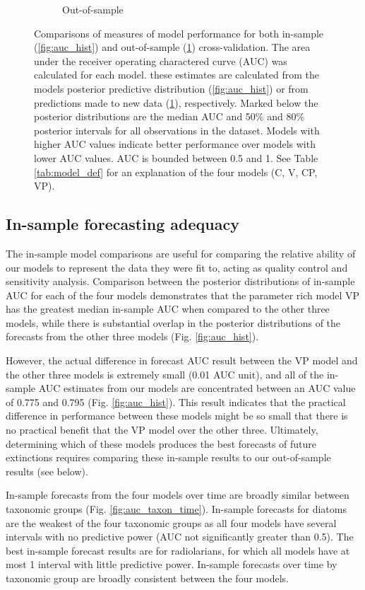 \documentclass[12pt,letterpaper]{article}
\begin{document}
\begin{refsection}
\begin{figure}[ht]
\begin{subfigure}[ht]{0.45\textwidth}
  \caption{Out-of-sample}
  \label{fig:fold_auc}
 \end{subfigure}
 \caption{Comparisons of measures of model performance for both in-sample (\ref{fig:auc_hist}) and out-of-sample (\ref{fig:fold_auc}) cross-validation. The area under the receiver operating charactered curve (AUC) was calculated for each model. these estimates are calculated from the models posterior predictive distribution (\ref{fig:auc_hist}) or from predictions made to new data (\ref{fig:fold_auc}), respectively. Marked below the posterior distributions are the median AUC and 50\% and 80\% posterior intervals for all observations in the dataset. Models with higher AUC values indicate better performance over models with lower AUC values. AUC is bounded between 0.5 and 1. See Table \ref{tab:model_def} for an explanation of the four models (C, V, CP, VP).}
 \label{fig:auc_compare}
\end{figure}

\subsection{In-sample forecasting adequacy}

The in-sample model comparisons are useful for comparing the relative ability of our models to represent the data they were fit to, acting as quality control and sensitivity analysis. Comparison between the posterior distributions of in-sample AUC for each of the four models demonstrates that the parameter rich model VP has the greatest median in-sample AUC when compared to the other three models, while there is substantial overlap in the posterior distributions of the forecasts from the other three models (Fig. \ref{fig:auc_hist}). 

However, the actual difference in forecast AUC result between the VP model and the other three models is extremely small (0.01 AUC unit), and all of the in-sample AUC estimates from our models are concentrated between an AUC value of 0.775 and 0.795 (Fig. \ref{fig:auc_hist}). This result indicates that the practical difference in performance between these models might be so small that there is no practical benefit that the VP model over the other three. Ultimately, determining which of these models produces the best forecasts of future extinctions requires comparing these in-sample results to our out-of-sample results (see below).

In-sample forecasts from the four models over time are broadly similar between taxonomic groups (Fig. \ref{fig:auc_taxon_time}). In-sample forecasts for diatoms are the weakest of the four taxonomic groups as all four models have several intervals with no predictive power (AUC not significantly greater than 0.5). The best in-sample forecast results are for radiolarians, for which all models have at most 1 interval with little predictive power. In-sample forecasts over time by taxonomic group are broadly consistent between the four models.


\end{refsection}
\end{document}
